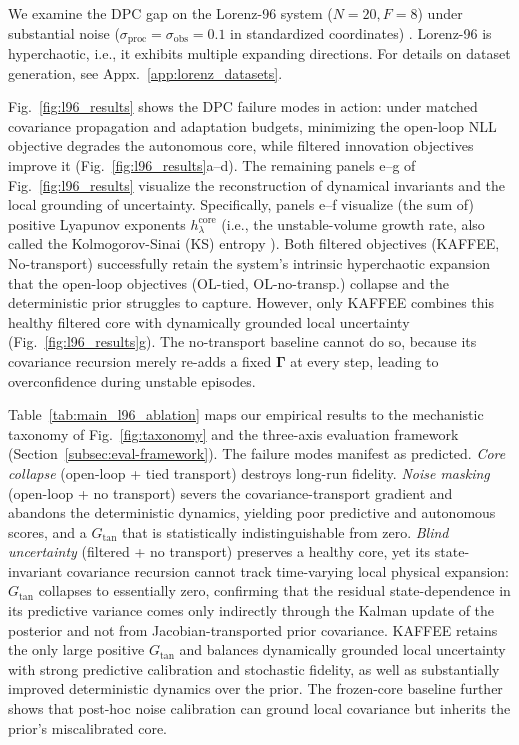 \documentclass{article}
\theoremstyle{plain}
\theoremstyle{definition}
\theoremstyle{remark}
\begin{document}
We examine the DPC gap on the Lorenz-96 system ($N=20, F=8$) under substantial noise ($\sigma_{\mathrm{proc}}=\sigma_{\mathrm{obs}}=0.1$ in standardized coordinates) \citep{lorenz1996predictability}. Lorenz-96 is hyperchaotic, i.e., it exhibits multiple expanding directions. For details on dataset generation, see Appx.~\ref{app:lorenz_datasets}.

Fig.~\ref{fig:l96_results} shows the DPC failure modes in action: under matched covariance propagation and adaptation budgets, minimizing the open-loop NLL objective degrades the autonomous core, while filtered innovation objectives improve it (Fig.~\ref{fig:l96_results}a--d). The remaining panels e--g of Fig.~\ref{fig:l96_results} visualize the reconstruction of dynamical invariants and the local grounding of uncertainty. Specifically, panels e--f visualize (the sum of) positive Lyapunov exponents $h_{\lambda}^{\mathrm{core}}$ (i.e., the unstable-volume growth rate, also called the Kolmogorov-Sinai (KS) entropy \citep{eckmann1985ergodic}).
Both filtered objectives (KAFFEE, No-transport) successfully retain the system's intrinsic hyperchaotic expansion that the open-loop objectives (OL-tied, OL-no-transp.) collapse and the deterministic prior struggles to capture. However, only KAFFEE combines this healthy filtered core with dynamically grounded local uncertainty (Fig.~\ref{fig:l96_results}g). The no-transport baseline cannot do so, because its covariance recursion merely re-adds a fixed $\bm\Gamma$ at every step, leading to overconfidence during unstable episodes.

Table~\ref{tab:main_l96_ablation} maps our empirical results to the mechanistic taxonomy of Fig.~\ref{fig:taxonomy} and the three-axis evaluation framework (Section~\ref{subsec:eval-framework}). The failure modes manifest as predicted. \emph{Core collapse} (open-loop + tied transport) destroys long-run fidelity. \emph{Noise masking} (open-loop + no transport) severs the covariance-transport gradient and abandons the deterministic dynamics, yielding poor predictive and autonomous scores, and a $G_{\mathrm{tan}}$ that is statistically indistinguishable from zero. \emph{Blind uncertainty} (filtered + no transport) preserves a healthy core, yet its state-invariant covariance recursion cannot track time-varying local physical expansion: $G_{\mathrm{tan}}$ collapses to essentially zero, confirming that the residual state-dependence in its predictive variance comes only indirectly through the Kalman update of the posterior and not from Jacobian-transported prior covariance. KAFFEE retains the only large positive $G_{\mathrm{tan}}$ and balances dynamically grounded local uncertainty with strong predictive calibration and stochastic fidelity, as well as substantially improved deterministic dynamics over the prior. The frozen-core baseline further shows that post-hoc noise calibration can ground local covariance but inherits the prior's miscalibrated core.
\end{document}
